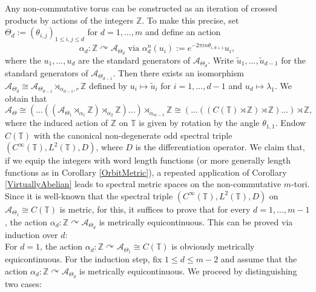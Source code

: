 \documentclass[a4paper,11pt,reqno]{amsart}
\numberwithin{equation}{section}
\numberwithin{equation}{section}
\theoremstyle{definition}
\theoremstyle{remark}
\theoremstyle{remark}
\begin{document}
Any non-commutative torus can be constructed as an iteration of crossed
products by actions of the integers $\mathbb{Z}$.
To make this precise, set $\Theta_{d}:=(\theta_{i,j})_{1\leq i,j\leq d}$ for $d=1,...,m$ and define an action 
\[
\alpha_{d}:\mathbb{Z}\curvearrowright\mathcal{A}_{\Theta_{d}}\text{ via }\alpha_{d}^n(u_{i}):=e^{-2\pi in\theta_{i,d+1}}u_{i},
\]
where the $u_{1},...,u_{d}$ are the standard generators of $\mathcal{A}_{\Theta_{d}}$.
Write $\widetilde{u}_{1},...,\widetilde{u}_{d-1}$ for the standard
generators of $\mathcal{A}_{\Theta_{d-1}}$. Then there exists an
isomorphism $\mathcal{A}_{\Theta_{d}}\cong\mathcal{A}_{\Theta_{d-1}}\rtimes_{\alpha_{d-1},r}\mathbb{Z}$
defined by $u_{i}\mapsto\widetilde{u}_{i}$ for $i=1,...,d-1$ and
$u_{d}\mapsto\lambda_{1}$. We obtain that
\[
\mathcal{A}_{\Theta}\cong(...((\mathcal{A}_{\Theta_{1}}\rtimes_{\alpha_{1}}\mathbb{Z})\rtimes_{\alpha_{2}}\mathbb{Z})...)\rtimes_{\alpha_{m-1}}\mathbb{Z}\cong(...((C(\mathbb{T})\rtimes\mathbb{Z})\rtimes\mathbb{Z})...)\rtimes\mathbb{Z},
\]
where the induced action of $\mathbb{Z}$ on $\mathbb{T}$ is given
by rotation by the angle $\theta_{1,1}$. Endow $C(\mathbb{T})$ with
the canonical non-degenerate odd spectral triple $(C^{\infty}(\mathbb{T}),L^{2}(\mathbb{T}),D)$,
where $D$ is the differentiation operator. We claim that, if we equip
the integers with word length functions (or more generally length
functions as in Corollary \ref{OrbitMetric}), a repeated application
of Corollary \ref{VirtuallyAbelian} leads to spectral metric spaces on the non-commutative $m$-tori. Since it is well-known that the spectral triple $(C^{\infty}(\mathbb{T}),L^{2}(\mathbb{T}),D)$
on $\mathcal{A}_{\Theta_{1}}\cong C(\mathbb{T})$ is metric, for this, it suffices to prove that for every $d=1,...,m-1$,
the action $\alpha_{d}:\mathbb{Z}\curvearrowright\mathcal{A}_{\Theta_{d}}$
is metrically equicontinuous. This can be proved via induction over
$d$: \\

For $d=1$, the action $\alpha_{d}:\mathbb{Z}\curvearrowright\mathcal{A}_{\Theta_{1}}\cong C(\mathbb{T})$
is obviously metrically equicontinuous. For the induction step, fix
$1\leq d\leq m-2$ and assume that the action $\alpha_{d}:\mathbb{Z}\curvearrowright\mathcal{A}_{\Theta_{d}}$
is metrically equicontinuous. We proceed by distinguishing two cases: \\
\end{document}
